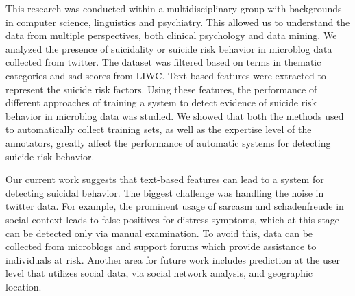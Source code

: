 \documentclass[11pt]{article}
\begin{document}
This research was conducted within a multidisciplinary group with backgrounds in computer science, linguistics and psychiatry. This allowed us to understand the data from multiple perspectives, both clinical psychology and data mining. We analyzed the presence of suicidality or suicide risk behavior in microblog data collected from twitter. The dataset was filtered based on terms in thematic categories and sad scores from LIWC. Text-based features were extracted to represent the suicide risk factors. Using these features, the performance of different approaches of training a system to detect evidence of suicide risk behavior in microblog data was studied. We showed that both the methods used to automatically collect training sets, as well as the expertise level of the annotators, greatly affect the performance of automatic systems for detecting suicide risk behavior.

Our current work suggests that text-based features can lead to a system for detecting suicidal behavior. The biggest challenge was handling the noise in twitter data. For example, the prominent usage of sarcasm and schadenfreude in social context leads to false positives for distress symptoms, which at this stage can be detected only via manual examination. To avoid this, data can be collected from microblogs and support forums which provide assistance to individuals at risk. Another area for future work includes prediction at the user level that utilizes social data, via social network analysis, and geographic location. 





\end{document}

